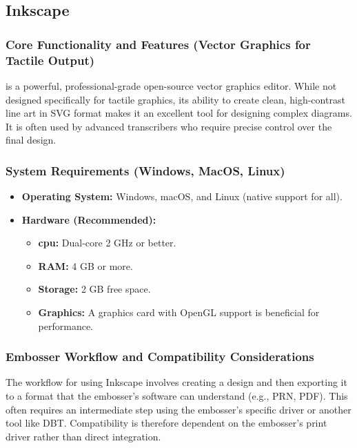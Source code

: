 \subsection{Inkscape}\label{ch14:ssec:inkscape}
\subsubsection{Core Functionality and Features (Vector Graphics for Tactile Output)}\label{ch14:sssec:inkscape-features}
 is a powerful, professional-grade open-source vector graphics editor\supercite{SoftorageInkscape, SteemitInkscape}. While not designed specifically for tactile graphics, its ability to create clean, high-contrast line art in SVG format makes it an excellent tool for designing complex diagrams. It is often used by advanced transcribers who require precise control over the final design.

\subsubsection{System Requirements (Windows, MacOS, Linux)}\label{ch14:sssec:inkscape-sysreq}
\begin{itemize}
	\item \textbf{Operating System:} Windows, macOS, and Linux (native support for all).
	\item \textbf{Hardware (Recommended):}
	      \begin{itemize}
		      \item \textbf{\gls{cpu}:} Dual-core 2 GHz  or better.
		      \item \textbf{RAM:} 4 GB or more.
		      \item \textbf{Storage:} 2 GB free space.
		      \item \textbf{Graphics:} A graphics card with OpenGL support is beneficial for performance.
	      \end{itemize}
\end{itemize}

\subsubsection{Embosser Workflow and Compatibility Considerations}\label{ch14:sssec:inkscape-compat}
The workflow for using Inkscape involves creating a design and then exporting it to a format that the embosser's software can understand (e.g., PRN, PDF). This often requires an intermediate step using the embosser's specific driver or another tool like DBT. Compatibility is therefore dependent on the embosser's print driver rather than direct integration.

